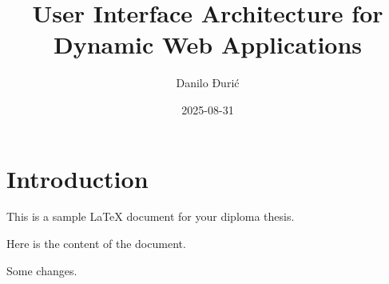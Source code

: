 \documentclass[12pt,a4paper]{article}
\title{User Interface Architecture for Dynamic Web Applications}
\author{Danilo Đurić}
\date{2025-08-31}
\begin{document}
\maketitle
\tableofcontents

\section{Introduction}

This is a sample LaTeX document for your diploma thesis.

Here is the content of the document.

Some changes.
\end{document}
